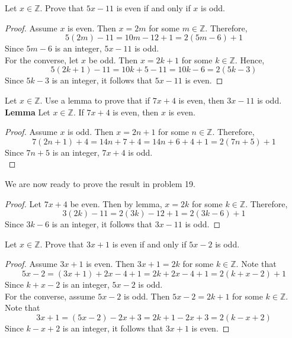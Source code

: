 \documentclass[12pt]{article}
\newcommand{\Z}{\mathbb{Z}}
\newenvironment{problem}[2][Problem]{\begin{trivlist}
		\item[\hskip \labelsep {\bfseries #1}\hskip \labelsep {\bfseries #2.}]}{\end{trivlist}}
\begin{document}
	\begin{problem}{18}
		Let $x\in \Z$. Prove that $5x-11$ is even if and only if $x$ is odd.
		\begin{proof}
			Assume $x$ is even. Then $x=2m$ for some $m\in \Z$. Therefore,
			\begin{equation*}
				5(2m)-11 = 10m-12+1=2(5m-6)+1
			\end{equation*}
			Since $5m-6$ is an integer, $5x-11$ is odd.\\
			For the converse, let $x$ be odd. Then $x=2k+1$ for some $k\in \Z$. Hence,
			\begin{equation*}
				5(2k+1)-11 = 10k+5-11=10k-6=2(5k-3)
			\end{equation*}
		Since $5k-3$ is an integer, it follows that $5x-11$ is even.
		\end{proof}
	\end{problem}

	\begin{problem}{19}
		Let $x \in \Z$. Use a lemma to prove that if $7x+4$ is even, then $3x-11$ is odd.\\
		
			\textbf{Lemma} Let $x\in \Z$. If $7x+4$ is even, then $x$ is even.
			\begin{proof}
				Assume $x$ is odd. Then $x=2n+1$ for some $n\in \Z$. Therefore,
				\begin{equation*}
					7(2n+1)+4= 14n+7+4=14n+6+4+1=2(7n+5)+1
				\end{equation*}
			Since $7n+5$ is an integer, $7x+4$ is odd.\\
			\end{proof}
			We are now ready to prove the result in problem 19.
			\begin{proof}
				Let $7x+4$ be even. Then by lemma, $x=2k$ for some $k\in \Z$. Therefore,
				\begin{equation*}
					3(2k)-11=2(3k)-12+1=2(3k-6)+1 
				\end{equation*}
			Since $3k-6$ is an integer, it follows that $3x-11$ is odd.
			\end{proof}
	\end{problem}

	\begin{problem}{20}
		Let $x\in \Z$. Prove that $3x+1$ is even if and only if $5x-2$ is odd.
		\begin{proof}
			Assume $3x+1$ is even. Then $3x+1=2k$ for some $k\in \Z$. Note that
			\begin{equation*}
				5x-2 = (3x+1)+2x-4+1=2k+2x-4+1=2(k+x-2)+1
			\end{equation*}
		Since $k+x-2$ is an integer, $5x-2$ is odd.\\
		For the converse, assume $5x-2$ is odd. Then $5x-2=2k+1$ for some $k\in \Z$. Note that
		\begin{equation*}
			3x+1=(5x-2)-2x+3=2k+1-2x+3=2(k-x+2)
		\end{equation*}
	Since $k-x+2$ is an integer, it follows that $3x+1$ is even.
		\end{proof}
	\end{problem}
\end{document}
